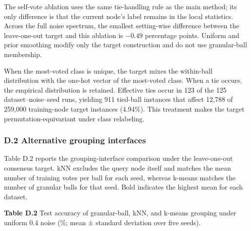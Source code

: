 The self-vote ablation uses the same tie-handling rule as the main method; its only difference is that the current node's label remains in the local statistics. Across the full noise spectrum, the smallest setting-wise difference between the leave-one-out target and this ablation is \(- 0.49\) percentage points. Uniform and prior smoothing modify only the target construction and do not use granular-ball membership.

When the most-voted class is unique, the target mixes the within-ball distribution with the one-hot vector of the most-voted class. When a tie occurs, the empirical distribution is retained. Effective ties occur in 123 of the 125 dataset--noise--seed runs, yielding 911 tied-ball instances that affect 12,788 of 259,000 training-node target instances (4.94\%). This treatment makes the target permutation-equivariant under class relabeling.

\subsubsection{D.2 Alternative grouping interfaces}\label{d.2-alternative-grouping-interfaces}

Table D.2 reports the grouping-interface comparison under the leave-one-out consensus target. kNN excludes the query node itself and matches the mean number of training votes per ball for each seed, whereas k-means matches the number of granular balls for that seed. Bold indicates the highest mean for each dataset.

\textbf{Table D.2} Test accuracy of granular-ball, kNN, and k-means grouping under uniform 0.4 noise (\%; mean ± standard deviation over five seeds).

